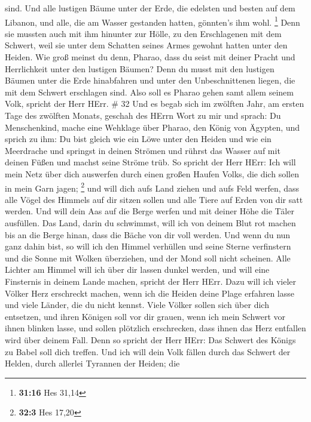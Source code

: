 sind. Und alle lustigen Bäume unter der Erde, die edelsten und besten
auf dem Libanon, und alle, die am Wasser gestanden hatten, gönnten's ihm
wohl. \footnote{\textbf{31:16} Hes 31,14}  Denn sie mussten
auch mit ihm hinunter zur Hölle, zu den Erschlagenen mit dem Schwert,
weil sie unter dem Schatten seines Armes gewohnt hatten unter den
Heiden.  Wie groß meinst du denn, Pharao, dass du seist mit
deiner Pracht und Herrlichkeit unter den lustigen Bäumen? Denn du musst
mit den lustigen Bäumen unter die Erde hinabfahren und unter den
Unbeschnittenen liegen, die mit dem Schwert erschlagen sind. Also soll
es Pharao gehen samt allem seinem Volk, spricht der Herr HErr. \# 32
 Und es begab sich im zwölften Jahr, am ersten Tage des
zwölften Monats, geschah des HErrn Wort zu mir und sprach: 
Du Menschenkind, mache eine Wehklage über Pharao, den König von Ägypten,
und sprich zu ihm: Du bist gleich wie ein Löwe unter den Heiden und wie
ein Meerdrache und springst in deinen Strömen und rührst das Wasser auf
mit deinen Füßen und machst seine Ströme trüb.  So spricht
der Herr HErr: Ich will mein Netz über dich auswerfen durch einen großen
Haufen Volks, die dich sollen in mein Garn jagen; \footnote{\textbf{32:3}
  Hes 17,20}  und will dich aufs Land ziehen und aufs Feld
werfen, dass alle Vögel des Himmels auf dir sitzen sollen und alle Tiere
auf Erden von dir satt werden.  Und will dein Aas auf die
Berge werfen und mit deiner Höhe die Täler ausfüllen.  Das
Land, darin du schwimmst, will ich von deinem Blut rot machen bis an die
Berge hinan, dass die Bäche von dir voll werden.  Und wenn
du nun ganz dahin bist, so will ich den Himmel verhüllen und seine
Sterne verfinstern und die Sonne mit Wolken überziehen, und der Mond
soll nicht scheinen.  Alle Lichter am Himmel will ich über
dir lassen dunkel werden, und will eine Finsternis in deinem Lande
machen, spricht der Herr HErr.  Dazu will ich vieler Völker
Herz erschreckt machen, wenn ich die Heiden deine Plage erfahren lasse
und viele Länder, die du nicht kennst.  Viele Völker sollen
sich über dich entsetzen, und ihren Königen soll vor dir grauen, wenn
ich mein Schwert vor ihnen blinken lasse, und sollen plötzlich
erschrecken, dass ihnen das Herz entfallen wird über deinem Fall.
 Denn so spricht der Herr HErr: Das Schwert des Königs zu
Babel soll dich treffen.  Und ich will dein Volk fällen
durch das Schwert der Helden, durch allerlei Tyrannen der Heiden; die
